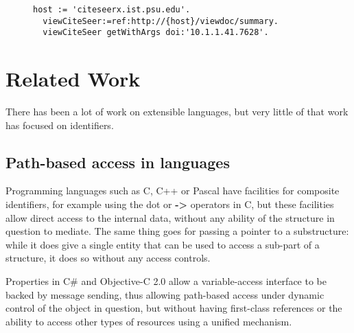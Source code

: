 \documentclass[preprint,authoryear]{acm_proc_article-sp}
\begin{document}

\begin{figure}[htbp]
\begin{lstlisting}[style=L,label=url-args,caption=URL arguments via reference and higher order message.]
  host := 'citeseerx.ist.psu.edu'.
  viewCiteSeer:=ref:http://{host}/viewdoc/summary.
  viewCiteSeer getWithArgs doi:'10.1.1.41.7628'.
\end{lstlisting}
\end{figure}


\section{Related Work}
\label{related-work}

There has been a lot of work on extensible languages, but very little of that work 
has focused on identifiers.  

\subsection{Path-based access in languages}

Programming languages such as C, C++ or Pascal have facilities for composite
identifiers, for example using the dot or {\bf -> } operators in C, but these facilities allow
direct access to the internal data, without any ability of the structure in question to 
mediate.  The same thing goes for passing a pointer to a substructure:  while it
does give a single entity that can be used to access a sub-part of a structure, it
does so without any access controls.

Properties in C\# and Objective-C 2.0 allow a variable-access interface to be backed by 
message sending, thus allowing path-based access under dynamic control of the object
in question, but without having first-class references or the ability to access other
types of resources using a unified mechanism.
\end{document}

